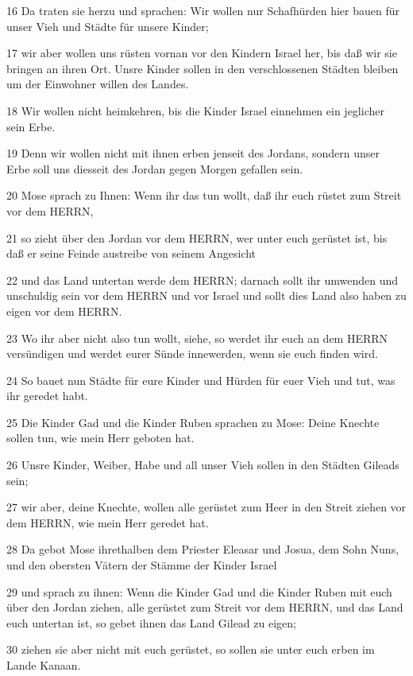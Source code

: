 \par 16 Da traten sie herzu und sprachen: Wir wollen nur Schafhürden hier bauen für unser Vieh und Städte für unsere Kinder;
\par 17 wir aber wollen uns rüsten vornan vor den Kindern Israel her, bis daß wir sie bringen an ihren Ort. Unsre Kinder sollen in den verschlossenen Städten bleiben um der Einwohner willen des Landes.
\par 18 Wir wollen nicht heimkehren, bis die Kinder Israel einnehmen ein jeglicher sein Erbe.
\par 19 Denn wir wollen nicht mit ihnen erben jenseit des Jordans, sondern unser Erbe soll uns diesseit des Jordan gegen Morgen gefallen sein.
\par 20 Mose sprach zu Ihnen: Wenn ihr das tun wollt, daß ihr euch rüstet zum Streit vor dem HERRN,
\par 21 so zieht über den Jordan vor dem HERRN, wer unter euch gerüstet ist, bis daß er seine Feinde austreibe von seinem Angesicht
\par 22 und das Land untertan werde dem HERRN; darnach sollt ihr umwenden und unschuldig sein vor dem HERRN und vor Israel und sollt dies Land also haben zu eigen vor dem HERRN.
\par 23 Wo ihr aber nicht also tun wollt, siehe, so werdet ihr euch an dem HERRN versündigen und werdet eurer Sünde innewerden, wenn sie euch finden wird.
\par 24 So bauet nun Städte für eure Kinder und Hürden für euer Vieh und tut, was ihr geredet habt.
\par 25 Die Kinder Gad und die Kinder Ruben sprachen zu Mose: Deine Knechte sollen tun, wie mein Herr geboten hat.
\par 26 Unsre Kinder, Weiber, Habe und all unser Vieh sollen in den Städten Gileads sein;
\par 27 wir aber, deine Knechte, wollen alle gerüstet zum Heer in den Streit ziehen vor dem HERRN, wie mein Herr geredet hat.
\par 28 Da gebot Mose ihrethalben dem Priester Eleasar und Josua, dem Sohn Nuns, und den obersten Vätern der Stämme der Kinder Israel
\par 29 und sprach zu ihnen: Wenn die Kinder Gad und die Kinder Ruben mit euch über den Jordan ziehen, alle gerüstet zum Streit vor dem HERRN, und das Land euch untertan ist, so gebet ihnen das Land Gilead zu eigen;
\par 30 ziehen sie aber nicht mit euch gerüstet, so sollen sie unter euch erben im Lande Kanaan.
